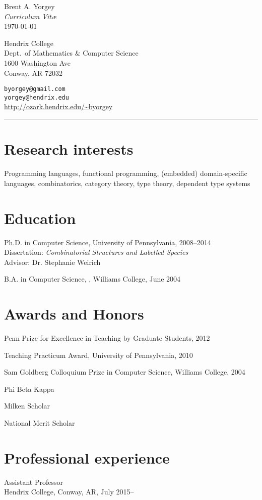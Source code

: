 \documentclass[12pt]{article}
\newcommand{\cvitem}{\par\hangpara{2em}{1}}
\begin{document}
\begin{center}
  {\huge Brent A. Yorgey} \\
  \emph{Curriculum Vit\ae} \\
  \today
\end{center}

\noindent
\parbox{3.5in}{
Hendrix College \\
Dept.\ of Mathematics \& Computer Science \\
1600 Washington Ave \\
Conway, AR 72032
}
\hfill
\parbox{3in}{
\texttt{byorgey@gmail.com} \\
\texttt{yorgey@hendrix.edu} \\
\url{http://ozark.hendrix.edu/~byorgey}
}
\medskip

\hrule

\section*{Research interests}
Programming languages, functional programming, (embedded)
domain-specific languages, combinatorics, category theory, type
theory, dependent type systems

\section*{Education}
\cvitem
Ph.D. in Computer Science, University of
Pennsylvania, 2008--2014 \\ Dissertation: \emph{Combinatorial
  Structures and Labelled Species} \\ Advisor: Dr. Stephanie Weirich

\cvitem B.A. in Computer Science, , Williams
College, June 2004

\section*{Awards and Honors}
\cvitem Penn Prize for Excellence in Teaching by Graduate Students, 2012
\cvitem Teaching Practicum Award, University of Pennsylvania, 2010
\cvitem Sam Goldberg Colloquium Prize in Computer Science, Williams
College, 2004
\cvitem Phi Beta Kappa
\cvitem Milken Scholar
\cvitem National Merit Scholar

\section*{Professional experience}
\cvitem
Assistant Professor \\
Hendrix College, Conway, AR, July 2015--
\end{document}
